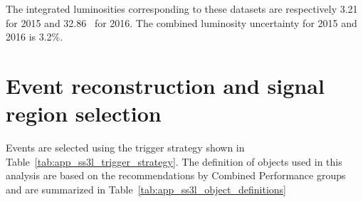 The integrated luminosities corresponding to these datasets are respectively 3.21~{\ifb} for 2015 and 32.86~{\ifb} for 2016.
The combined luminosity uncertainty for 2015 and 2016 is 3.2\%.


\section{Event reconstruction and signal region selection}
\label{app:ss3l_event_reconstruction_and_SR_selection}
Events are selected using the trigger strategy shown in Table~\ref{tab:app_ss3l_trigger_strategy}.
The definition of objects used in this analysis are based on the recommendations by Combined Performance groups and are summarized in Table~\ref{tab:app_ss3l_object_definitions}

\begin{table}[htbp]
    \caption{The trigger strategy used in the same-sign or three leptons and jets analysis.}
    \label{tab:app_ss3l_trigger_strategy}
\end{table}%


